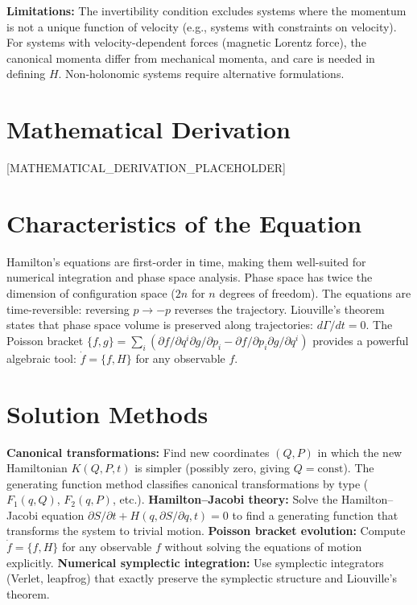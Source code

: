 \documentclass[11pt,openright]{book}
\begin{document}
\textbf{Limitations:} The invertibility condition excludes systems where the momentum is not a unique function of velocity (e.g., systems with constraints on velocity). For systems with velocity-dependent forces (magnetic Lorentz force), the canonical momenta differ from mechanical momenta, and care is needed in defining $H$. Non-holonomic systems require alternative formulations.


\section*{Mathematical Derivation}

[MATHEMATICAL_DERIVATION_PLACEHOLDER]

\section*{Characteristics of the Equation}

Hamilton's equations are first-order in time, making them well-suited for numerical integration and phase space analysis. Phase space has twice the dimension of configuration space ($2n$ for $n$ degrees of freedom). The equations are time-reversible: reversing $p \to -p$ reverses the trajectory. Liouville's theorem states that phase space volume is preserved along trajectories: $d\Gamma/dt = 0$. The Poisson bracket $\{f, g\} = \sum_i(\partial f/\partial q^i \partial g/\partial p_i - \partial f/\partial p_i \partial g/\partial q^i)$ provides a powerful algebraic tool: $\dot{f} = \{f, H\}$ for any observable $f$.
\section*{Solution Methods}

\textbf{Canonical transformations:} Find new coordinates $(Q, P)$ in which the new Hamiltonian $K(Q, P, t)$ is simpler (possibly zero, giving $Q = \text{const}$). The generating function method classifies canonical transformations by type ($F_1(q,Q)$, $F_2(q,P)$, etc.). \textbf{Hamilton--Jacobi theory:} Solve the Hamilton--Jacobi equation $\partial S/\partial t + H(q, \partial S/\partial q, t) = 0$ to find a generating function that transforms the system to trivial motion. \textbf{Poisson bracket evolution:} Compute $\dot{f} = \{f, H\}$ for any observable $f$ without solving the equations of motion explicitly. \textbf{Numerical symplectic integration:} Use symplectic integrators (Verlet, leapfrog) that exactly preserve the symplectic structure and Liouville's theorem.
\end{document}
